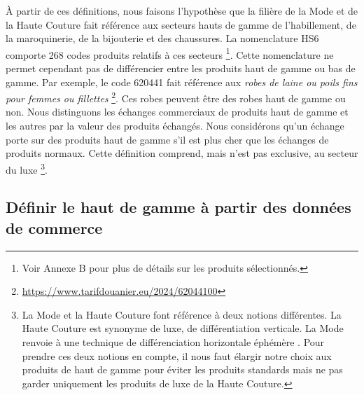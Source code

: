 \documentclass[french,10pt,a4paper]{article}
\begin{document}
À partir de ces définitions, nous faisons l'hypothèse que la filière de la Mode et de la Haute Couture fait référence aux secteurs hauts de gamme de l'habillement, de la maroquinerie, de la bijouterie et des chaussures. La nomenclature HS6 comporte 268 codes produits relatifs à ces secteurs \footnote{Voir Annexe B pour plus de détails sur les produits sélectionnés.}. Cette nomenclature ne permet cependant pas de différencier entre les produits haut de gamme ou bas de gamme. Par exemple, le code 620441 fait référence aux \textit{\og robes de laine ou poils fins pour femmes ou fillettes \fg{}} \footnote{\href{https://www.tarifdouanier.eu/2024/62044100}{https://www.tarifdouanier.eu/2024/62044100}}. Ces robes peuvent être des robes haut de gamme ou non. Nous distinguons les échanges commerciaux de produits haut de gamme et les autres par la valeur des produits échangés. Nous considérons qu'un échange porte sur des produits haut de gamme s'il est plus cher que les échanges de produits \og normaux\fg{}. Cette définition comprend, mais n'est pas exclusive, au secteur du luxe \footnote{La Mode et la Haute Couture font référence à deux notions différentes. La Haute Couture est synonyme de luxe, de différentiation verticale. La Mode renvoie à une technique de différenciation horizontale éphémère \citep{Agogue2010}. Pour prendre ces deux notions en compte, il nous faut élargir notre choix aux produits de haut de gamme pour éviter les produits \og standards\fg{} mais ne pas garder uniquement les produits de luxe de la Haute Couture.}.

\subsection{Définir le haut de gamme à partir des données de commerce}
\end{document}
